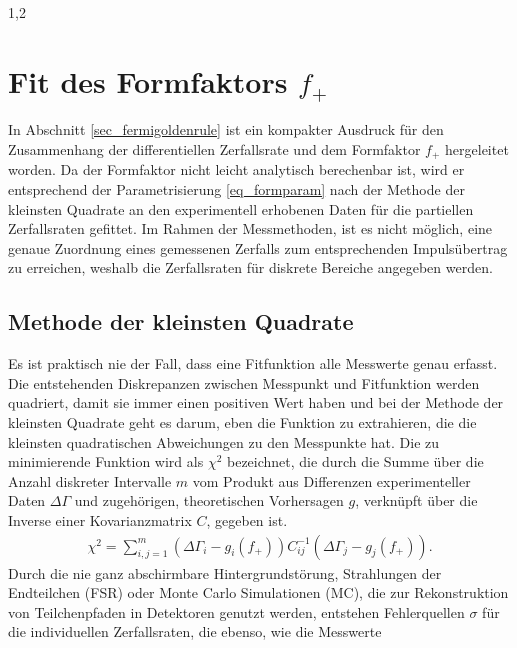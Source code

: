 \documentclass[11pt,a4paper,twoside]{report}
\begin{document}
\begin{spacing}{1,2}
\section{Fit des Formfaktors $f_+$}
In Abschnitt \ref{sec_fermigoldenrule} ist ein kompakter Ausdruck für den Zusammenhang der differentiellen Zerfallsrate und dem 
Formfaktor $f_+$ hergeleitet worden. Da der Formfaktor nicht leicht analytisch berechenbar ist, wird er entsprechend der Parametrisierung \eqref{eq_formparam}
nach der Methode der kleinsten Quadrate an den experimentell erhobenen Daten für die partiellen Zerfallsraten gefittet. Im Rahmen der Messmethoden, ist es
nicht möglich, eine genaue Zuordnung eines gemessenen Zerfalls zum entsprechenden Impulsübertrag zu erreichen, weshalb die Zerfallsraten für diskrete Bereiche
angegeben werden. 

\subsection{Methode der kleinsten Quadrate}
Es ist praktisch nie der Fall, dass eine Fitfunktion alle Messwerte genau erfasst. Die entstehenden Diskrepanzen zwischen Messpunkt und Fitfunktion werden
quadriert, damit sie immer einen positiven Wert haben und bei der Methode der kleinsten Quadrate geht es darum, eben die Funktion zu extrahieren, die die 
kleinsten quadratischen Abweichungen zu den Messpunkte hat. Die zu minimierende Funktion wird als $\chi^2$ bezeichnet, die durch die Summe über die Anzahl diskreter 
Intervalle $m$ vom Produkt aus Differenzen experimenteller Daten $\Delta \Gamma$ und zugehörigen, theoretischen Vorhersagen $g$, verknüpft über die 
Inverse einer Kovarianzmatrix $C$, gegeben ist.
\begin{align}
 \chi^2 = \sum\limits_{i,j=1}^m (\Delta \Gamma_i - g_i(f_+))C^{-1}_{ij}(\Delta \Gamma_j - g_j(f_+)).
 \label{eq_chi2}
\end{align}
Durch die nie ganz abschirmbare Hintergrundstörung, Strahlungen der Endteilchen (FSR) oder Monte Carlo Simulationen (MC), die zur Rekonstruktion von 
Teilchenpfaden in Detektoren genutzt werden, entstehen Fehlerquellen $\sigma$ für die individuellen Zerfallsraten, die ebenso, wie die Messwerte 

\end{spacing}
\end{document}
